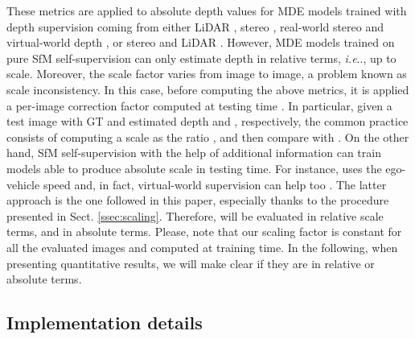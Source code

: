 \documentclass[journal]{IEEEtran}
\makeatletter
\DeclareRobustCommand\onedot{\futurelet\@let@token\@onedot}
\def\@onedot{\ifx\@let@token.\else.\null\fi\xspace}
\def\ie{\emph{i.e}\onedot} \def\Ie{\emph{I.e}\onedot}
\newcommand{\sSect}[1]{Sect. \ref{ssec:#1}}
\makeatother
\begin{document}
These metrics are applied to absolute depth values for MDE models trained with depth supervision coming from either LiDAR  \cite{Eigen:2014, Liu:2016, Roy:2016, Laina:2016, Cao:2017, Fu:2018DORN, Gurram:2018, He:2018, Xu:2018, Yin:2019, Guizilini:2020}, stereo \cite{Saxena:2007, Garg:2016, Godard:2017, Godard:2019MonoDepth2, Pillai:2019}, real-world stereo and virtual-world depth \cite{Zhao:2019GASDA, Pnvr:2020SharinGAN}, or stereo and LiDAR \cite{Kuznietsov:2017, He:2018wearable}. 
However, MDE models trained on pure SfM self-supervision can only estimate depth in relative terms, {\ie}, up to scale. Moreover, the scale factor varies from image to image, a problem known as scale inconsistency. In this case, before computing the above metrics, it is applied a per-image correction factor computed at testing time \cite{Zhou:2017, Yin:2018GeoNet, Zhao:2020, Godard:2019MonoDepth2, Guizilini:2020semantic, Cheng:2020S3Net}. In particular, given a test image  with GT and estimated depth  and , respectively, the common practice consists of computing a scale  as the ratio , and then compare  with . On the other hand, SfM self-supervision with the help of additional information can train models able to produce absolute scale in testing time. For instance, \cite{Guizilini:20203D} uses the ego-vehicle speed and, in fact, virtual-world supervision can help too \cite{Zheng:2018T2Net, Kundu:2018AdaDepth}. The latter approach is the one followed in this paper, especially thanks to the procedure presented in \sSect{scaling}. Therefore,  will be evaluated in relative scale terms, and  in absolute terms. Please, note that our  scaling factor is constant for all the evaluated images and computed at training time. In the following, when presenting quantitative results, we will make clear if they are in relative or absolute terms.

\subsection{Implementation details}
\label{ssec:implementation}
\end{document}

